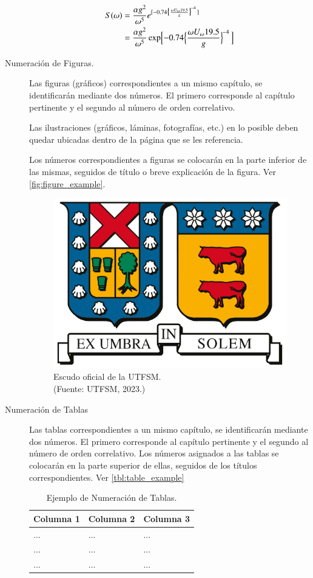 \begin{description}
    \begin{align}
    S(\omega) 
    &= \frac{\alpha g^2}{\omega^5} e^{[ -0.74\bigl\{\frac{\omega U_\omega 19.5}{g}\bigr\}^{\!-4}\,]} \\
    \label{eq:align_example}
    &= \frac{\alpha g^2}{\omega^5} \exp\Bigl[ -0.74\Bigl\{\frac{\omega U_\omega 19.5}{g}\Bigr\}^{\!-4}\,\Bigr] 
    \end{align}

\item[Numeración de Figuras.] Las figuras (gráficos) correspondientes a un mismo capítulo, se identificarán mediante dos números. El primero corresponde al capítulo pertinente y el segundo al número de orden correlativo.


Las ilustraciones (gráficos, láminas, fotografías, etc.) en lo posible deben quedar ubicadas dentro de la página que se les referencia.

Los números correspondientes a figuras se colocarán en la parte inferior de las mismas, seguidos de título o breve explicación de la figura. Ver \autoref{fig:figure_example}.
	\begin{figure}[ht!]
	\centering
	\includegraphics[width=.25\textwidth]{figures/escudo-utfsm.png}
	
	\caption[Escudo oficial de la UTFSM.]{Escudo oficial de la UTFSM.\\
    {\footnotesize (Fuente: UTFSM, 2023.)}}
	
	\label{fig:figure_example}
	\end{figure}

\item[Numeración de Tablas] Las tablas correspondientes a un mismo capítulo, se identificarán mediante dos números. El primero corresponde al capítulo pertinente y el segundo al número de orden correlativo.
Los números asignados a las tablas se colocarán en la parte superior de ellas, seguidos de los títulos correspondientes. Ver \autoref{tbl:table_example}

\begin{table}[ht]
    \centering
    \caption[Ejemplo: Numeración de Tablas]{Ejemplo de Numeración de Tablas.}
    \begin{tabular}{@{}p{3cm}|p{3cm}|p{3cm}@{}}
        \toprule
        \textbf{Columna 1} & \textbf{Columna 2} & \textbf{Columna 3} \\
        \hline\hline
        ... & ... & ... \\
        \hline
        ... & ... & ... \\
        \hline
        ... & ... & ... \\
        \bottomrule
    \end{tabular}
    \label{tbl:table_example}
\end{table}


\end{description}
